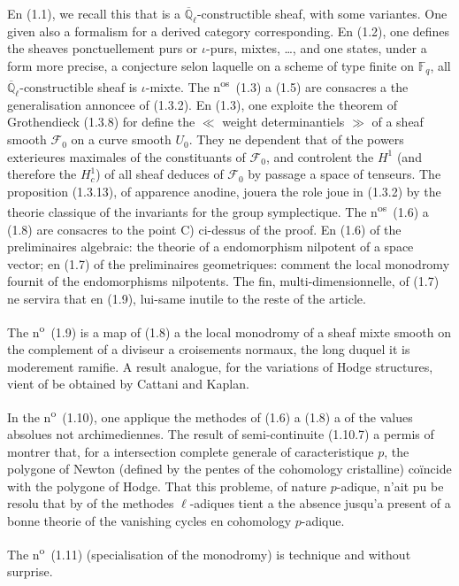 \documentclass[12pt,a4paper]{article}
\theoremstyle{plain}
\theoremstyle{definition}
\theoremstyle{definition}
\theoremstyle{remark}
\begin{document}
En (1.1), we recall this that is a $\overline{\mathbb{Q}}_\ell$-constructible sheaf, with some variantes. One given also a formalism for a derived category corresponding. En (1.2), one defines the sheaves ponctuellement purs or $\iota$-purs, mixtes, \ldots, and one states, under a form more precise, a conjecture selon laquelle on a scheme of type finite on $\mathbb{F}_q$, all $\overline{\mathbb{Q}}_\ell$-constructible sheaf is $\iota$-mixte. The n\textsuperscript{os}~(1.3) a (1.5) are consacres a the generalisation annoncee of (1.3.2). En (1.3), one exploite the theorem of Grothendieck (1.3.8) for define the $\ll$ weight determinantiels $\gg$ of a sheaf smooth $\mathscr{F}_0$ on a curve smooth $U_0$. They ne dependent that of the powers exterieures maximales of the constituants of $\mathscr{F}_0$, and controlent the $H^1$ (and therefore the $H_c^1$) of all sheaf deduces of $\mathscr{F}_0$ by passage a space of tenseurs. The proposition (1.3.13), of apparence anodine, jouera the role joue in (1.3.2) by the theorie classique of the invariants for the group symplectique. The n\textsuperscript{os}~(1.6) a (1.8) are consacres to the point C) ci-dessus of the proof. En (1.6) of the preliminaires algebraic: the theorie of a endomorphism nilpotent of a space vector; en (1.7) of the preliminaires geometriques: comment the local monodromy fournit of the endomorphisms nilpotents. The fin, multi-dimensionnelle, of (1.7) ne servira that en (1.9), lui-same inutile to the reste of the article.

The n\textsuperscript{o}~(1.9) is a map of (1.8) a the local monodromy of a sheaf mixte smooth on the complement of a diviseur a croisements normaux, the long duquel it is moderement ramifie. A result analogue, for the variations of Hodge structures, vient of be obtained by Cattani and Kaplan.

In the n\textsuperscript{o}~(1.10), one applique the methodes of (1.6) a (1.8) a of the values absolues not archimediennes. The result of semi-continuite (1.10.7) a permis of montrer that, for a intersection complete generale of caracteristique $p$, the polygone of Newton (defined by the pentes of the cohomology cristalline) co\"incide with the polygone of Hodge. That this probleme, of nature $p$-adique, n'ait pu be resolu that by of the methodes $\ell$-adiques tient a the absence jusqu'a present of a bonne theorie of the vanishing cycles en cohomology $p$-adique.

The n\textsuperscript{o}~(1.11) (specialisation of the monodromy) is technique and without surprise.
\end{document}

